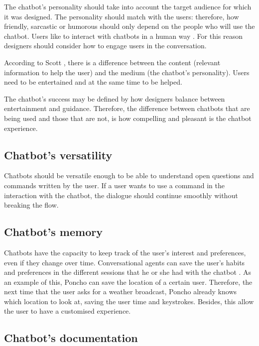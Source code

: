 \documentclass[a4paper,10pt]{article}
\begin{document}
The chatbot’s personality should take into account the target audience for which it was designed. The personality should match with the users: therefore, how friendly, sarcastic or humorous should only depend on the people who will use the chatbot. Users like to interact with chatbots in a human way \cite{HeuristicsWebPage}. For this reason designers should consider how to engage users in the conversation. 

According to Scott \cite{HeuristicsWebPage}, there is a difference between the content (relevant information to help the user) and the medium (the chatbot’s personality). Users need to be entertained and at the same time to be helped.

The chatbot’s success may be defined by how designers balance between entertainment and guidance. Therefore, the difference between chatbots that are being used and those that are not, is how compelling and pleasant is the chatbot experience.   

\subsection*{Chatbot's versatility}

Chatbots should be versatile enough to be able to understand open questions and commands written by the user. If a user wants to use a command in the interaction with the chatbot, the dialogue should continue smoothly without breaking the flow.

\subsection*{Chatbot's memory}

Chatbots have the capacity to keep track of the user's interest and preferences, even if they change over time. Conversational agents can save the user's habits and preferences in the different sessions that he or she had with the chatbot \cite{shneiderman1997direct}. As an example of this, Poncho can save the location of a certain user. Therefore, the next time that the user asks for a weather broadcast, Poncho already knows which location to look at, \cite{poncho2017} saving the user time and keystrokes. Besides, this allow the user to have a customised experience. 


\subsection*{Chatbot's documentation}
\end{document}
